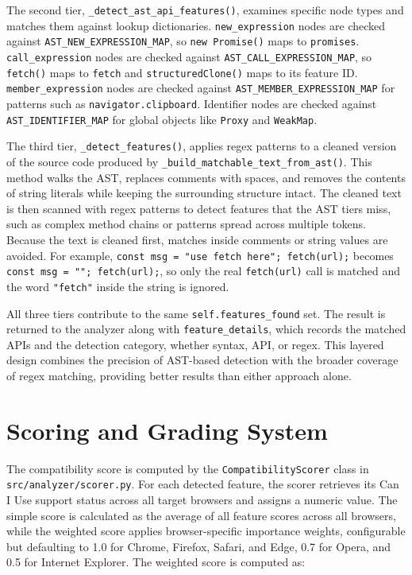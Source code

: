The second tier, \texttt{\_detect\_ast\_api\_features()}, examines specific node types and matches them against lookup dictionaries. \texttt{new\_expression} nodes are checked against \texttt{AST\_NEW\_EXPRESSION\_MAP}, so \texttt{new Promise()} maps to \texttt{promises}. \texttt{call\_expression} nodes are checked against \texttt{AST\_CALL\_EXPRESSION\_MAP}, so \texttt{fetch()} maps to \texttt{fetch} and \texttt{structuredClone()} maps to its feature ID. \texttt{member\_expression} nodes are checked against \texttt{AST\_MEMBER\_EXPRESSION\_MAP} for patterns such as \texttt{navigator.clipboard}. Identifier nodes are checked against \texttt{AST\_IDENTIFIER\_MAP} for global objects like \texttt{Proxy} and \texttt{WeakMap}.

The third tier, \texttt{\_detect\_features()}, applies regex patterns to a cleaned version of the source code produced by \texttt{\_build\_matchable\_text\_from\_ast()}. This method walks the AST, replaces comments with spaces, and removes the contents of string literals while keeping the surrounding structure intact. The cleaned text is then scanned with regex patterns to detect features that the AST tiers miss, such as complex method chains or patterns spread across multiple tokens. Because the text is cleaned first, matches inside comments or string values are avoided. For example, \texttt{const msg = "use fetch here"; fetch(url);} becomes \texttt{const msg = ""; fetch(url);}, so only the real \texttt{fetch(url)} call is matched and the word \texttt{"fetch"} inside the string is ignored.

All three tiers contribute to the same \texttt{self.features\_found} set. The result is returned to the analyzer along with \texttt{feature\_details}, which records the matched APIs and the detection category, whether syntax, API, or regex. This layered design combines the precision of AST-based detection with the broader coverage of regex matching, providing better results than either approach alone.

\section{Scoring and Grading System}
\label{sec:scoring}

The compatibility score is computed by the \texttt{CompatibilityScorer} class in \texttt{src/analyzer/scorer.py}. For each detected feature, the scorer retrieves its Can I Use support status across all target browsers and assigns a numeric value. The simple score is calculated as the average of all feature scores across all browsers, while the weighted score applies browser-specific importance weights, configurable but defaulting to 1.0 for Chrome, Firefox, Safari, and Edge, 0.7 for Opera, and 0.5 for Internet Explorer. The weighted score is computed as:


